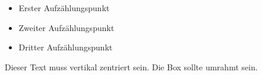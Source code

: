 \documentclass[a3paper,13pt]{tubsposter}
\begin{document}

\begin{gausspage}[sender=bottom,bgcolor=tuOrange]
  \showtubslogo[right]
  
  \begin{segment}[bgimage=infozentrum.jpg,imagefit=vclip]{4}
  \end{segment}
  \itemsep0mm
  \begin{segment}[bgcolor=tuViolet,fgcolor=tuWhite]{2}
    \begin{itemize}
      \item Erster Aufzählungspunkt
      \item Zweiter Aufzählungspunkt
      \item Dritter Aufzählungspunkt
    \end{itemize}
  \end{segment}
  \begin{segment}[c,bgcolor=tuOrange,fgcolor=tuWhite,frame=fbox]{1}
    Dieser Text muss vertikal zentriert sein. Die Box sollte umrahmt sein.
  \end{segment}
  \begin{segment}[bgcolor=tuGreenLight]{1}
  \end{segment}
\end{gausspage}
\end{document}
